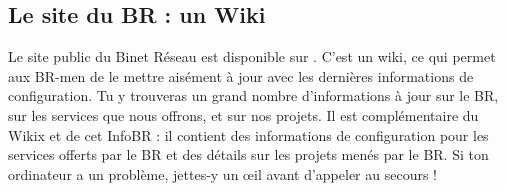 
\subsection{Le site du BR : un Wiki}
\label{siteBR}

Le site public du Binet Réseau est disponible sur . C'est un wiki, ce qui permet aux BR-men de le mettre aisément
à jour avec les dernières informations de configuration.
Tu y trouveras un grand nombre d'informations à jour sur le BR, sur les services que nous offrons, et sur nos projets.
Il est complémentaire du Wikix et de cet InfoBR : il contient des informations de configuration pour les services offerts par le
BR et des détails sur les projets menés par le BR.
Si ton ordinateur a un problème, jettes-y un œil avant d'appeler au secours !
